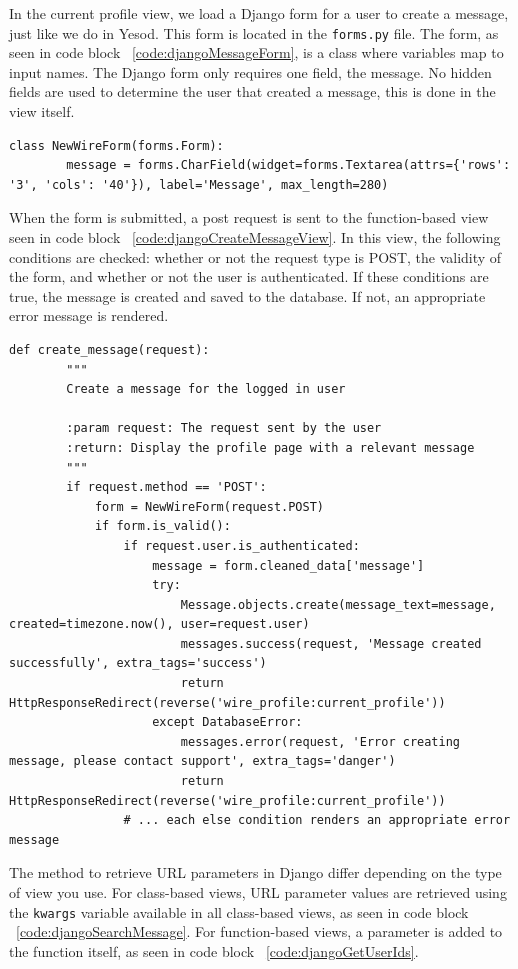 In the current profile view, we load a Django form for a user to create a message,
just like we do in Yesod. This form is located in the \texttt{forms.py} file. The
form, as seen in code block ~\ref{code:djangoMessageForm}, is a class where variables map
to input names. The Django form only requires one field, the message. No hidden
fields are used to determine the user that created a message, this is done in
the view itself.

\begin{lstlisting}[caption={Django message form},label={code:djangoMessageForm}]
	class NewWireForm(forms.Form):
		message = forms.CharField(widget=forms.Textarea(attrs={'rows': '3', 'cols': '40'}), label='Message', max_length=280)
\end{lstlisting}

When the form is submitted, a post request is sent to the function-based view
seen in code block ~\ref{code:djangoCreateMessageView}. In this view, the following
conditions are checked: whether or not the request type is POST, the validity of the
form, and whether or not the user is authenticated. If these conditions are true,
the message is created and saved to the database. If not, an appropriate error
message is rendered.

\begin{lstlisting}[caption={Function-based create message view},label={code:djangoCreateMessageView}]
	def create_message(request):
		"""
		Create a message for the logged in user

		:param request: The request sent by the user
		:return: Display the profile page with a relevant message
		"""
		if request.method == 'POST':
			form = NewWireForm(request.POST)
			if form.is_valid():
				if request.user.is_authenticated:
					message = form.cleaned_data['message']
					try:
						Message.objects.create(message_text=message, created=timezone.now(), user=request.user)
						messages.success(request, 'Message created successfully', extra_tags='success')
						return HttpResponseRedirect(reverse('wire_profile:current_profile'))
					except DatabaseError:
						messages.error(request, 'Error creating message, please contact support', extra_tags='danger')
						return HttpResponseRedirect(reverse('wire_profile:current_profile'))
				# ... each else condition renders an appropriate error message
\end{lstlisting}

The method to retrieve URL parameters in Django differ depending on the type
of view you use. For class-based views, URL parameter values are retrieved using
the \texttt{kwargs} variable available in all class-based views, as seen in
code block ~\ref{code:djangoSearchMessage}. For function-based views, a
parameter is added to the function itself, as seen in code block ~\ref{code:djangoGetUserIds}. 

